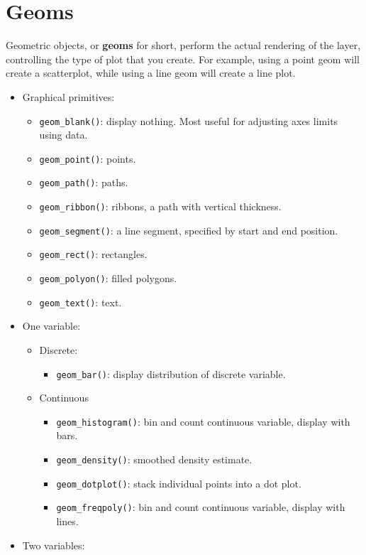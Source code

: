 \section{Geoms}\label{sec:geom}

Geometric objects, or \textbf{geoms} for short, perform the actual
rendering of the layer, controlling the type of plot that you create.
For example, using a point geom will create a scatterplot, while using a
line geom will create a line plot.

\begin{itemize}
\tightlist
\item
  Graphical primitives:

  \begin{itemize}
  \tightlist
  \item
    \texttt{geom\_blank()}: display nothing. Most useful for adjusting
    axes limits using data.
  \item
    \texttt{geom\_point()}: points.
  \item
    \texttt{geom\_path()}: paths.
  \item
    \texttt{geom\_ribbon()}: ribbons, a path with vertical thickness.
  \item
    \texttt{geom\_segment()}: a line segment, specified by start and end
    position.
  \item
    \texttt{geom\_rect()}: rectangles.
  \item
    \texttt{geom\_polyon()}: filled polygons.
  \item
    \texttt{geom\_text()}: text.
  \end{itemize}
\item
  One variable:

  \begin{itemize}
  \tightlist
  \item
    Discrete:

    \begin{itemize}
    \tightlist
    \item
      \texttt{geom\_bar()}: display distribution of discrete variable.
    \end{itemize}
  \item
    Continuous

    \begin{itemize}
    \tightlist
    \item
      \texttt{geom\_histogram()}: bin and count continuous variable,
      display with bars.
    \item
      \texttt{geom\_density()}: smoothed density estimate.
    \item
      \texttt{geom\_dotplot()}: stack individual points into a dot plot.
    \item
      \texttt{geom\_freqpoly()}: bin and count continuous variable,
      display with lines.
    \end{itemize}
  \end{itemize}
\item
  Two variables:


\end{itemize}
